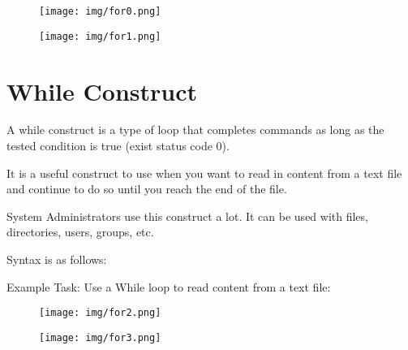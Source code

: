 \documentclass[slides]{pgnotes}
\begin{document}
\begin{figure}
\centering
\texttt{[image: img/for0.png]}
\caption{}
\end{figure}

\begin{figure}
\centering
\texttt{[image: img/for1.png]}
\caption{}
\end{figure}


\section{While Construct}\label{while-construct}

A while construct is a type of loop that completes commands as long as
the tested condition is true (exist status code 0).

It is a useful construct to use when you want to read in content from a
text file and continue to do so until you reach the end of the file.

System Administrators use this construct a lot. It can be used with
files, directories, users, groups, etc.

Syntax is as follows:

Example Task: Use a While loop to read content from a text file:

\begin{figure}
\centering
\texttt{[image: img/for2.png]}
\caption{}
\end{figure}

\begin{figure}
\centering
\texttt{[image: img/for3.png]}
\caption{}
\end{figure}
\end{document}
